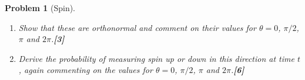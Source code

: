 \documentclass[a4paper]{article}
\theoremstyle{new}
\newtheorem{qns}{Problem}[subsection]
\begin{document}
\begin{qns}[Spin]
\begin{enumerate}[label=(\roman*)]
\begin{figure}[H]
\end{figure}
The two spin eigenstates with respect to this new measurement direction are
$$\begin{pmatrix}\cos(\theta/2)\\i\sin(\theta/2)\\\end{pmatrix}\text{  and   }\begin{pmatrix}i\sin(\theta/2)\\\cos(\theta/2)\\\end{pmatrix}$$
\item Show that these are orthonormal and comment on their values for $\theta=0$, $\pi/2$, $\pi$ and $2\pi$.\hfill\textbf{[3]}
\item Derive the probability of measuring spin up or down in this direction at time $t$, again commenting on the values for $\theta=0$, $\pi/2$, $\pi$ and $2\pi$.\hfill\textbf{[6]}
\end{enumerate}
\end{qns}
\end{document}
